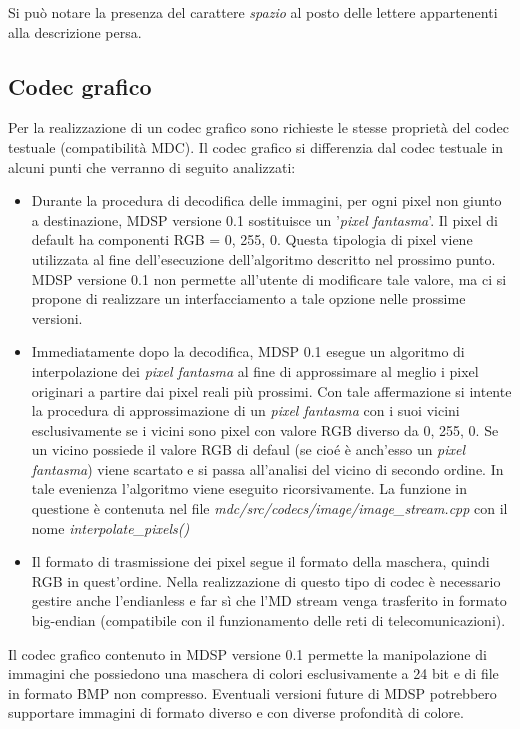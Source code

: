Si può notare la presenza del carattere \emph{spazio} al posto delle lettere
appartenenti alla descrizione persa.

\subsection{Codec grafico}
Per la realizzazione di un codec grafico sono richieste le stesse proprietà del
codec testuale (compatibilità MDC). Il codec grafico si differenzia dal codec
testuale in alcuni punti che verranno di seguito analizzati:

\begin{itemize}
  \item Durante la procedura di decodifica delle immagini, per ogni pixel
  non giunto a destinazione, MDSP versione 0.1 sostituisce un '\emph{pixel
  fantasma}'. Il pixel di default ha componenti RGB = 0, 255, 0. Questa
  tipologia di pixel viene utilizzata al fine dell'esecuzione dell'algoritmo
  descritto nel prossimo punto. MDSP versione 0.1 non permette all'utente di
  modificare tale valore, ma ci si propone di realizzare un interfacciamento a tale opzione nelle prossime versioni.
  \item Immediatamente dopo la decodifica, MDSP 0.1 esegue un algoritmo di
  interpolazione dei \emph{pixel fantasma} al fine di approssimare al meglio i
  pixel originari a partire dai pixel reali più prossimi. Con tale affermazione
  si intente la procedura di approssimazione di un \emph{pixel fantasma} con i
  suoi vicini esclusivamente se i vicini sono pixel con valore RGB diverso da
  0, 255, 0. Se un vicino possiede il valore RGB di defaul (se cioé è anch'esso
  un \emph{pixel fantasma}) viene scartato e si passa all'analisi del vicino di
  secondo ordine. In tale evenienza l'algoritmo viene eseguito ricorsivamente.
  La funzione in questione è contenuta nel file
  \textit{mdc/src/codecs/image/image\_stream.cpp} con il nome
  \textit{interpolate\_pixels()}
  \item Il formato di trasmissione dei pixel segue il formato della maschera,
  quindi RGB in quest'ordine. Nella realizzazione di questo tipo di codec è
  necessario gestire anche l'endianless e far sì che l'MD stream venga
  trasferito in formato big-endian (compatibile con il funzionamento delle reti
  di telecomunicazioni).
\end{itemize}

Il codec grafico contenuto in MDSP versione 0.1 permette la manipolazione di
immagini che possiedono una maschera di colori esclusivamente a 24 bit e di
file in formato BMP non compresso. Eventuali versioni future di MDSP potrebbero
supportare immagini di formato diverso e con diverse profondità di colore.


